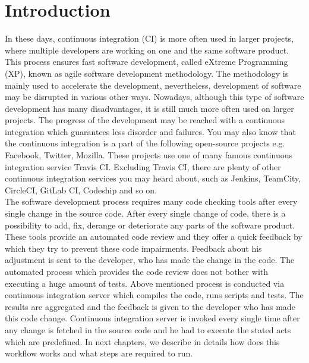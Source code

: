 
\newtheorem{DEF}{Definition}

\chapter{Introduction}

In these days, continuous integration (CI) is more often used in larger projects, where multiple developers are working on one and the same software product. This process ensures fast software development, called eXtreme Programming (XP), known as agile software development methodology. The methodology is mainly used to accelerate the development, nevertheless, development of software may be disrupted in various other ways. Nowadays, although this type of software development has many disadvantages, it is still much more often used on larger projects. The progress of the development may be reached with a continuous integration which guarantees less disorder and failures. You may also know that the continuous integration is a part of the following open-source projects e.g. Facebook, Twitter, Mozilla. These projects use one of many famous continuous integration service Travis CI. Excluding Travis CI, there are plenty of other continuous integration services you may heard about, such as Jenkins, TeamCity, CircleCI, GitLab CI, Codeship and so on.\\

The software development process requires many code checking tools after every single change in the source code. After every single change of code, there is a possibility to add, fix, derange or deteriorate any parts of the software product. These tools provide an automated code review and they offer a quick feedback by which they try to prevent these code impairments. Feedback about his adjustment is sent to the developer, who has made the change in the code. The automated process which provides the code review does not bother with executing a huge amount of tests. Above mentioned process is conducted via continuous integration server which compiles the code, runs scripts and tests. The results are aggregated and the feedback is given to the developer who has made this code change. Continuous integration server is invoked every single time after any change is fetched in the source code and he had to execute the stated acts which are predefined. In next chapters, we describe in details how does this workflow works and what steps are required to run.\\

